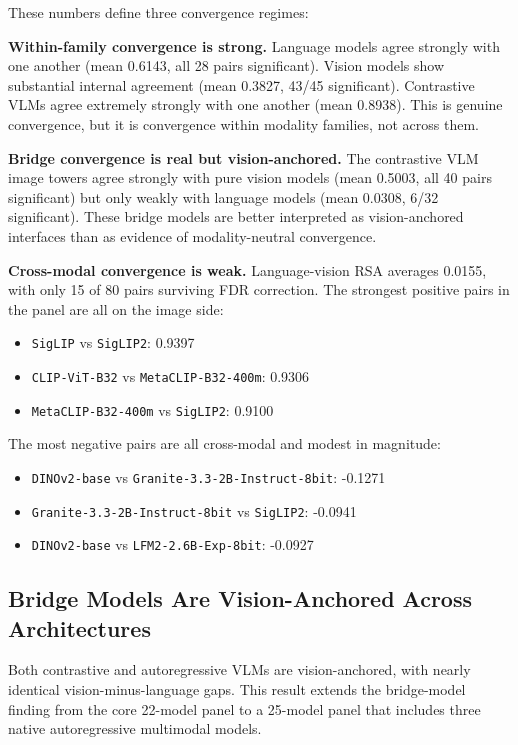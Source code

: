 \documentclass[10pt]{article}
\providecommand{\tightlist}{%
  \setlength{\itemsep}{0pt}\setlength{\parskip}{0pt}}
\begin{document}
These numbers define three convergence regimes:

\textbf{Within-family convergence is strong.} Language models agree
strongly with one another (mean 0.6143, all 28 pairs significant).
Vision models show substantial internal agreement (mean 0.3827, 43/45
significant). Contrastive VLMs agree extremely strongly with one another
(mean 0.8938). This is genuine convergence, but it is convergence within
modality families, not across them.

\textbf{Bridge convergence is real but vision-anchored.} The contrastive
VLM image towers agree strongly with pure vision models (mean 0.5003,
all 40 pairs significant) but only weakly with language models (mean
0.0308, 6/32 significant). These bridge models are better interpreted as
vision-anchored interfaces than as evidence of modality-neutral
convergence.

\textbf{Cross-modal convergence is weak.} Language-vision RSA averages
0.0155, with only 15 of 80 pairs surviving FDR correction. The strongest
positive pairs in the panel are all on the image side:

\begin{itemize}
\tightlist
\item
  \texttt{SigLIP} vs \texttt{SigLIP2}: 0.9397
\item
  \texttt{CLIP-ViT-B32} vs \texttt{MetaCLIP-B32-400m}: 0.9306
\item
  \texttt{MetaCLIP-B32-400m} vs \texttt{SigLIP2}: 0.9100
\end{itemize}

The most negative pairs are all cross-modal and modest in magnitude:

\begin{itemize}
\tightlist
\item
  \texttt{DINOv2-base} vs \texttt{Granite-3.3-2B-Instruct-8bit}: -0.1271
\item
  \texttt{Granite-3.3-2B-Instruct-8bit} vs \texttt{SigLIP2}: -0.0941
\item
  \texttt{DINOv2-base} vs \texttt{LFM2-2.6B-Exp-8bit}: -0.0927
\end{itemize}

\subsection{Bridge Models Are Vision-Anchored Across
Architectures}\label{bridge-models-are-vision-anchored-across-architectures}

Both contrastive and autoregressive VLMs are vision-anchored, with
nearly identical vision-minus-language gaps. This result extends the
bridge-model finding from the core 22-model panel to a 25-model panel
that includes three native autoregressive multimodal models.
\end{document}
